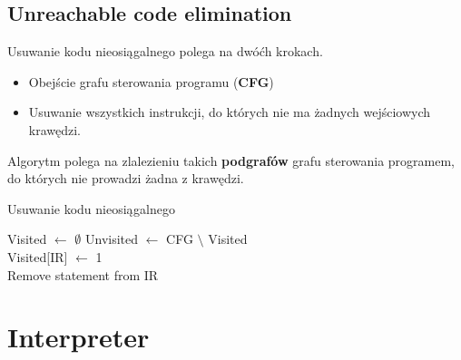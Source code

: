 \documentclass[leqno, 12pt]{article}
\newcommand{\spacing}{\vskip 0.5cm}
\begin{document}
		\newpage

		\subsection{Unreachable code elimination}
		
			Usuwanie kodu nieosiągalnego polega na dwóćh krokach.
			\begin{itemize}
				\item Obejście grafu sterowania programu (\textbf{CFG})
				\item Usuwanie wszystkich instrukcji, do których nie ma żadnych wejściowych krawędzi.
			\end{itemize}
			
			\spacing

			Algorytm polega na zlalezieniu takich \textbf{podgrafów} grafu sterowania programem, do których
			nie prowadzi żadna z krawędzi.
			
			\spacing

			\begin{algorithm}
				\caption{Usuwanie kodu nieosiągalnego}
				\begin{algorithmic}[1]
						\State Visited $\gets$ $\emptyset$
						\State {}
						\State Unvisited $\gets$ CFG $\setminus$ Visited
						\State {}
					\EndProcedure
					\\
						\State Visited[IR] $\gets$ 1
							\State {}
						\EndFor
					\EndProcedure
					\\
							\State Remove statement from IR
						\EndFor
					\EndProcedure
				\end{algorithmic}
			\end{algorithm}

		\newpage

	\section{Interpreter}
\end{document}
